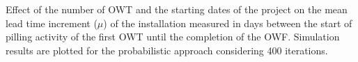 \label{fig:seasonaleffect}
Effect of the number of OWT and the starting dates of the project on the mean lead time increment ($\mu$) of the installation measured in days between the start of pilling activity of the first OWT until the completion of the OWF. Simulation results are plotted for the probabilistic approach considering 400 iterations.